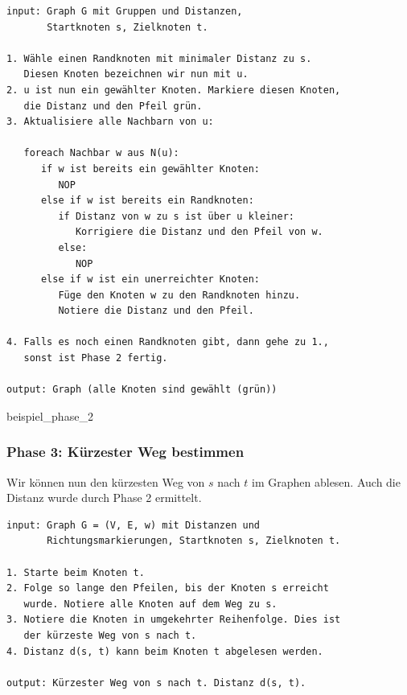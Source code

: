 \begin{lstlisting}[language={pseudocode}, caption={Dijkstra-Algorithmus Phase 2. \texttt{NOP} steht für No Operation (nichts zu tun).}, label={lst-algo-shortest-path-dijkstra-phase-2}]
input: Graph G mit Gruppen und Distanzen, 
       Startknoten s, Zielknoten t.

1. Wähle einen Randknoten mit minimaler Distanz zu s. 
   Diesen Knoten bezeichnen wir nun mit u.
2. u ist nun ein gewählter Knoten. Markiere diesen Knoten, 
   die Distanz und den Pfeil grün.
3. Aktualisiere alle Nachbarn von u:

   foreach Nachbar w aus N(u):
      if w ist bereits ein gewählter Knoten:
         NOP
      else if w ist bereits ein Randknoten:
         if Distanz von w zu s ist über u kleiner:
            Korrigiere die Distanz und den Pfeil von w.
         else:
            NOP
      else if w ist ein unerreichter Knoten:
         Füge den Knoten w zu den Randknoten hinzu.
         Notiere die Distanz und den Pfeil.

4. Falls es noch einen Randknoten gibt, dann gehe zu 1.,
   sonst ist Phase 2 fertig.

output: Graph (alle Knoten sind gewählt (grün))
\end{lstlisting}

{beispiel_phase_2}

\subsubsection{Phase 3: Kürzester Weg bestimmen}

Wir können nun den kürzesten Weg von $s$ nach $t$ im Graphen ablesen. Auch die Distanz wurde durch Phase 2 ermittelt.

\begin{lstlisting}[language={pseudocode}, caption={Dijkstra-Algorithmus Phase 3.}, label={lst-algo-shortest-path-dijkstra-phase-3}]
input: Graph G = (V, E, w) mit Distanzen und 
       Richtungsmarkierungen, Startknoten s, Zielknoten t.

1. Starte beim Knoten t.
2. Folge so lange den Pfeilen, bis der Knoten s erreicht 
   wurde. Notiere alle Knoten auf dem Weg zu s.
3. Notiere die Knoten in umgekehrter Reihenfolge. Dies ist 
   der kürzeste Weg von s nach t.
4. Distanz d(s, t) kann beim Knoten t abgelesen werden.

output: Kürzester Weg von s nach t. Distanz d(s, t).
\end{lstlisting}

